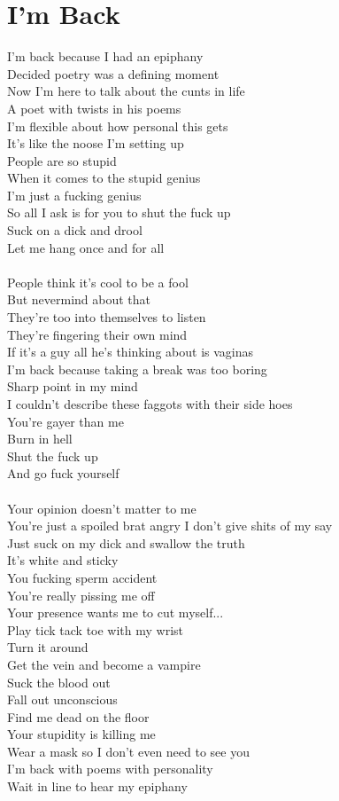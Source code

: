 \documentclass[12pt, b5paper, oneside]{book}
\begin{document}
\section{I'm Back}
I'm back because I had an epiphany
\\Decided poetry was a defining moment
\\Now I'm here to talk about the cunts in life
\\A poet with twists in his poems
\\I'm flexible about how personal this gets
\\It's like the noose I'm setting up
\\People are so stupid
\\When it comes to the stupid genius
\\I'm just a fucking genius
\\So all I ask is for you to shut the fuck up
\\Suck on a dick and drool
\\Let me hang once and for all
%
\\\\People think it's cool to be a fool
\\But nevermind about that
\\They're too into themselves to listen
\\They're fingering their own mind
\\If it's a guy all he's thinking about is vaginas
\\I'm back because taking a break was too boring
\\Sharp point in my mind
\\I couldn't describe these faggots with their side hoes
\\You're gayer than me
\\Burn in hell
\\Shut the fuck up
\\And go fuck yourself
%
\\\\Your opinion doesn't matter to me
\\You're just a spoiled brat angry I don't give shits of my say 
\\Just suck on my dick and swallow the truth
\\It's white and sticky
\\You fucking sperm accident
\\You're really pissing me off
\\Your presence wants me to cut myself...
\\Play tick tack toe with my wrist
\\Turn it around
\\Get the vein and become a vampire
\\Suck the blood out
\\Fall out unconscious
\\Find me dead on the floor
\\Your stupidity is killing me
\\Wear a mask so I don't even need to see you
\\I'm back with poems with personality
\\Wait in line to hear my epiphany 
\newpage
\end{document}
